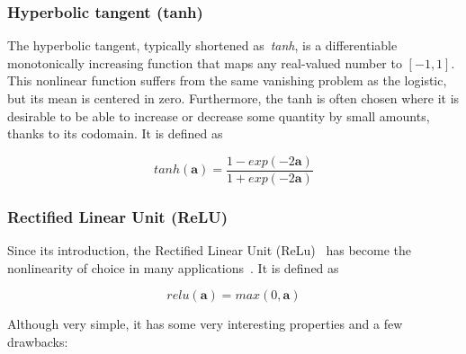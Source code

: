 \subsubsection{Hyperbolic tangent (tanh)}\label{sec:tanh}

The hyperbolic tangent, typically shortened as~\emph{tanh}, is a differentiable
monotonically increasing function that maps any real-valued number to $[-1, 1]$.
This nonlinear function suffers from the same vanishing problem as the
logistic, but its mean is centered in zero. Furthermore, the tanh is often
chosen where it is desirable to be able to increase or decrease some quantity
by small amounts, thanks to its codomain. It is defined as

\begin{equation}\label{eq:tanh}
    tanh(\mathbf{a}) = \frac{1-exp(-2\mathbf{a})}{1+exp(-2\mathbf{a})}
\end{equation}


\subsubsection{Rectified Linear Unit (ReLU)}\label{sec:relu}
Since its introduction, the Rectified Linear Unit
(ReLu)~\cite{Jarrett-ICCV2009-small,Nair+Hinton-2010} has become the
nonlinearity of choice in many applications~\cite{Krizhevsky-2012,
LeCun-et-al-Nature2015,Glorot+al-AI-2011-small}. It is defined as

\begin{equation}\label{eq:relu}
    relu(\mathbf{a}) = max(0, \mathbf{a})
\end{equation}

Although very simple, it has some very interesting properties and a few
drawbacks:

